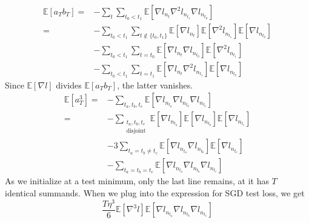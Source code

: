 \documentclass{article}
\theoremstyle{plain}
\theoremstyle{definition}
\newcommand{\expct}[1]{\mathbb{E}\left[#1\right]}
\begin{document}
            \begin{align*}
                \expct{a_T b_T}
                    =&- \sum_{t} \sum_{t_0 < t_1}
                        \expct{\nabla l_{n_t} \nabla^2 l_{n_{t_1}} \nabla l_{n_{t_0}}}
                    \\
                    =&- \sum_{t_0 < t_1}  
                        \sum_{t \notin \{t_0, t_1\}} 
                            \expct{\nabla l_{n_t}} \expct{\nabla^2 l_{n_{t_1}}} \expct{\nabla l_{n_{t_0}}}
                    \\&- \sum_{t_0 < t_1}  
                        \sum_{t = t_0}
                            \expct{\nabla l_{n_t} \nabla l_{n_{t_0}}} \expct{\nabla^2 l_{n_{t_1}}}
                    \\&- \sum_{t_0 < t_1}  
                        \sum_{t = t_1}
                            \expct{\nabla l_{n_t} \nabla^2 l_{n_{t_1}}} \expct{\nabla l_{n_{t_0}}}
            \end{align*}
            Since $\expct{\nabla l}$ divides $\expct{a_T b_T}$, the latter
            vanishes.
            \begin{align*}
                \expct{a_T^3}
                    =&- \sum_{t_a, t_b, t_c}
                            \expct{\nabla l_{n_{t_a}} \nabla l_{n_{t_b}} \nabla l_{n_{t_c}}}
                    \\
                    =&- \sum_{\substack{t_a, t_b, t_c\\ \text{disjoint}}}  
                            \expct{\nabla l_{n_{t_a}}} \expct{\nabla l_{n_{t_b}}} \expct{\nabla l_{n_{t_c}}}
                    \\&-3 \sum_{t_a=t_b\neq t_c}  
                            \expct{\nabla l_{n_{t_a}} \nabla l_{n_{t_b}}} \expct{\nabla l_{n_{t_c}}}
                    \\&-\sum_{t_a=t_b=t_c}  
                            \expct{\nabla l_{n_{t_a}} \nabla l_{n_{t_b}} \nabla l_{n_{t_c}}}
            \end{align*}
            As we initialize at a test minimum, only the last line remains, at
            it has $T$ identical summands.
            When we plug into the expression for SGD test loss, we get
            $$
                \frac{T \eta^3 }{6}
                \expct{\nabla^3 l}
                \expct{\nabla l_{n_{t_a}} \nabla l_{n_{t_b}} \nabla l_{n_{t_c}}}
            $$

\end{document}
